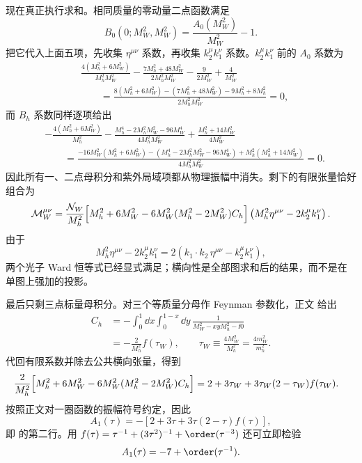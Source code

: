 \begin{derivation}
现在真正执行求和。相同质量的零动量二点函数满足
\begin{equation*}
 B_0(0;M_W^2,M_W^2)=\frac{A_0(M_W^2)}{M_W^2}-1.
\end{equation*}
把它代入上面五项，先收集 $\eta^{\mu\nu}$ 系数，再收集 $k_2^\mu k_1^\nu$ 系数。$k_2^\mu k_1^\nu$ 前的 $A_0$ 系数为
\begin{align*}
&\frac{4(M_h^2+6M_W^2)}{M_h^2M_W^2}
-\frac{7M_h^2+48M_W^2}{2M_h^2M_W^2}
-\frac{9}{2M_W^2}+\frac{4}{M_W^2}\\
&\qquad
=\frac{8(M_h^2+6M_W^2)-(7M_h^2+48M_W^2)-9M_h^2+8M_h^2}
{2M_h^2M_W^2}=0,
\end{align*}
而 $B_h$ 系数同样逐项给出
\begin{align*}
&-\frac{4(M_h^2+6M_W^2)}{M_h^2}
-\frac{M_h^4-2M_h^2M_W^2-96M_W^4}{4M_h^2M_W^2}
+\frac{M_h^2+14M_W^2}{4M_W^2}\\
&\qquad
=\frac{-16M_W^2(M_h^2+6M_W^2)
-(M_h^4-2M_h^2M_W^2-96M_W^4)
+M_h^2(M_h^2+14M_W^2)}{4M_h^2M_W^2}=0.
\end{align*}
因此所有一、二点母积分和紫外局域项都从物理振幅中消失。剩下的有限张量恰好组合为
\begin{equation*}
\mathcal M_W^{\mu\nu}
=\frac{\mathcal N_W}{M_h^2}
\Bigl[M_h^2+6M_W^2-6M_W^2(M_h^2-2M_W^2)C_h\Bigr]
\left(M_h^2\eta^{\mu\nu}-2k_2^\mu k_1^\nu\right).
\end{equation*}
由于
\begin{equation*}
M_h^2\eta^{\mu\nu}-2k_2^\mu k_1^\nu
=2\left(k_1\!\cdot k_2\,\eta^{\mu\nu}-k_2^\mu k_1^\nu\right),
\end{equation*}
两个光子 Ward 恒等式已经显式满足；横向性是全部图求和后的结果，而不是在单图上强加的投影。

最后只剩三点标量母积分。对三个等质量分母作 Feynman 参数化，正文 给出
\begin{align*}
 C_h
&=-\int_0^1\dd x\int_0^{1-x}\dd y\,
\frac{1}{M_W^2-xyM_h^2-\ii0}\\
&=-\frac{2}{M_h^2}f(\tau_W),
\qquad
\tau_W\equiv\frac{4M_W^2}{M_h^2}=\frac{4m_W^2}{m_h^2}.
\end{align*}
代回有限系数并除去公共横向张量，得到
\begin{align*}
\frac{2}{M_h^2}
\Bigl[M_h^2+6M_W^2-6M_W^2(M_h^2-2M_W^2)C_h\Bigr]
&=2+3\tau_W+3\tau_W(2-\tau_W)f(\tau_W).
\end{align*}
按照正文对一圈函数的振幅符号约定，因此
\begin{equation*}
\boxed{
A_1(\tau)
=-\left[2+3\tau+3\tau(2-\tau)f(\tau)\right],}
\end{equation*}
即 的第二行。用
$f(\tau)=\tau^{-1}+(3\tau^2)^{-1}+\order(\tau^{-3})$
还可立即检验
\begin{equation*}
A_1(\tau)=-7+\order(\tau^{-1}).
\end{equation*}
\end{derivation}

